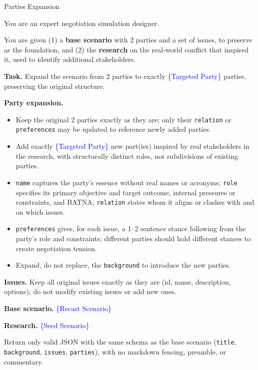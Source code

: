 \begin{table}[p]
\centering
\begin{promptbox}{Parties Expansion}
\begin{userbox}
\scriptsize
You are an expert negotiation simulation designer.

\smallskip
You are given (1) a \textbf{base scenario} with 2 parties and a set of issues, to preserve as the foundation, and (2) the \textbf{research} on the real-world conflict that inspired it, used to identify additional stakeholders.

\smallskip
\textbf{Task.} Expand the scenario from 2 parties to exactly \textcolor{blue}{\{Targeted Party\}} parties, preserving the original structure.

\smallskip
\textbf{Party expansion.}
\begin{itemize}[leftmargin=*, noitemsep, topsep=2pt]
\item Keep the original 2 parties exactly as they are; only their \texttt{relation} or \texttt{preferences} may be updated to reference newly added parties.
\item Add exactly \textcolor{blue}{\{Targeted Party\}} new part(ies) inspired by real stakeholders in the research, with structurally distinct roles, not subdivisions of existing parties.
\item \texttt{name} captures the party's essence without real names or acronyms; \texttt{role} specifies its primary objective and target outcome, internal pressures or constraints, and BATNA; \texttt{relation} states whom it aligns or clashes with and on which issues.
\item \texttt{preferences} gives, for each issue, a 1--2 sentence stance following from the party's role and constraints; different parties should hold different stances to create negotiation tension.
\item Expand, do not replace, the \texttt{background} to introduce the new parties.
\end{itemize}

\smallskip
\textbf{Issues.} Keep all original issues exactly as they are (id, name, description, options); do not modify existing issues or add new ones.

\smallskip
\textbf{Base scenario.} \textcolor{blue}{\{Recast Scenario\}}

\smallskip
\textbf{Research.} \textcolor{blue}{\{Seed Scenario\}}

\smallskip
Return only valid JSON with the same schema as the base scenario (\texttt{title}, \texttt{background}, \texttt{issues}, \texttt{parties}), with no markdown fencing, preamble, or commentary.
\end{userbox}
\end{promptbox}
\vspace{-0.25cm}
\caption{Prompt for party-axis expansion.}
\vspace{-0.3cm}
\label{tab:prompt-parties-exp}
\end{table}

